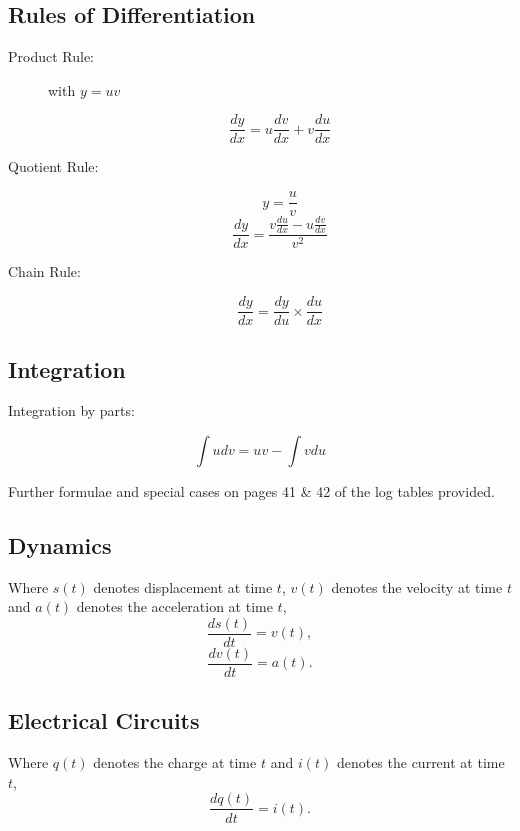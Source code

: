 \documentclass[a4paper,12pt]{article}
\begin{document}
	\subsection*{Rules of Differentiation}
\begin{description}
\item[Product Rule:]  with $y = uv$
	
	
	\[ \frac{dy}{dx} = u \frac{dv}{dx} +  v \frac{du}{dx} \]
	
\item[Quotient Rule:] \[ y = \frac{u}{v}\]
	\[ \frac{dy}{dx}  = \frac{v \frac{du}{dx} - u \frac{dv}{dx} }{v^2} \]
	
	
	
\item[Chain Rule:]
	
	\[ \frac{dy}{dx} = \frac{dy}{du} \times \frac{du}{dx}  \]
\end{description}
	
	\subsection*{Integration}
	
	Integration by parts: 
	
	\[ \int u dv = uv - \int v du \]  
	
	Further formulae and special cases on pages 41 \& 42 of the log tables provided.

\subsection*{Dynamics}
Where $s(t)$ denotes displacement at time $t$, $v(t)$ denotes the velocity at time $t$ and $a(t)$
denotes the acceleration at time $t$, 
\[  \frac{ds(t)}{dt}  = v(t),\]
\[  \frac{dv(t)}{dt}  = a(t).\]

\subsection*{Electrical Circuits}
Where $q(t)$ denotes the charge at time $t$ and $i(t)$ denotes the current at time $t$,
\[  \frac{dq(t)}{dt}  = i(t).\]
\end{document}
